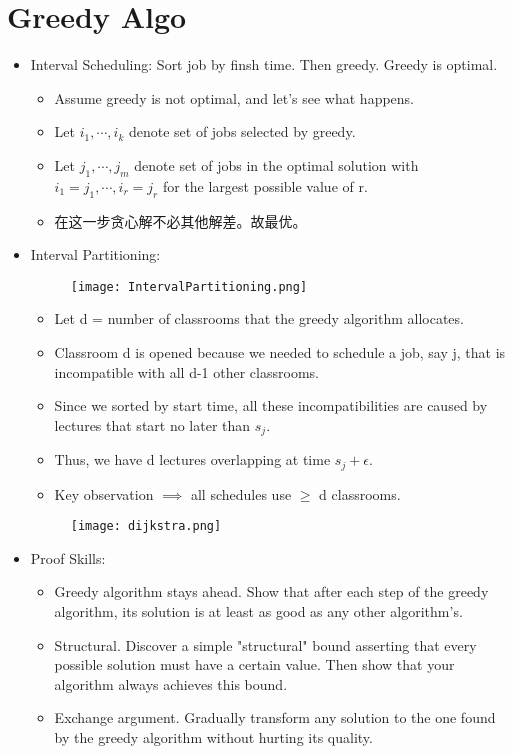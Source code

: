 \documentclass[10pt,a4paper,twocolumn]{article}
\begin{document}
\section{Greedy Algo}
\begin{itemize}
  \item Interval Scheduling: Sort job by finsh time. Then greedy. Greedy is optimal.
  \begin{itemize}
    \item Assume greedy is not optimal, and let's see what happens.
    \item Let \(i_1,\cdots,i_k\) denote set of jobs selected by greedy.
    \item Let \(j_1,\cdots,j_m\) denote set of jobs in the optimal solution with \(i_1=j_1,\cdots,i_r=j_r\) for the largest possible value of r.
    \item 在这一步贪心解不必其他解差。故最优。
  \end{itemize}
  \item Interval Partitioning:
  \begin{figure}[h]
    \centering
    \texttt{[image: IntervalPartitioning.png]}
  \end{figure}
  \begin{itemize}
    \item Let d = number of classrooms that the greedy algorithm allocates.
    \item Classroom d is opened because we needed to schedule a job, say j, that is incompatible with all d-1 other classrooms.
    \item Since we sorted by start time, all these incompatibilities are caused by lectures that start no later than \(s_j\).
    \item Thus, we have d lectures overlapping at time \(s_j + \epsilon\).
    \item Key observation \(\implies\) all schedules use \(\ge\) d classrooms.
  \end{itemize}
  \begin{figure}[h]
    \centering
    \texttt{[image: dijkstra.png]}
  \end{figure}
  \item Proof Skills:
    \begin{itemize}
      \item Greedy algorithm stays ahead. Show that after each step of the greedy algorithm, its solution is at least as good as any other algorithm's.
      \item Structural. Discover a simple "structural" bound asserting that every possible solution must have a certain value. Then show that your algorithm always achieves this bound.
      \item Exchange argument. Gradually transform any solution to the one found by the greedy algorithm without hurting its quality.
    \end{itemize}
\end{itemize}
\end{document}
